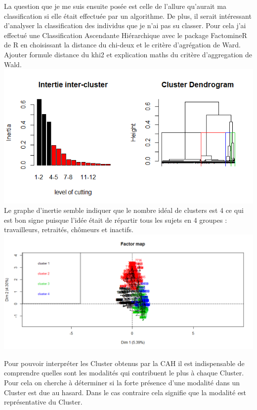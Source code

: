 \documentclass{book}
\begin{document}
\noindent
La question que je me suis ensuite posée est celle de l'allure qu'aurait ma classification si elle était effectuée par un algorithme. De plus, il serait intéressant d'analyser la classification des individus que je n'ai pas su classer.
Pour cela j'ai effectué une Classification Ascendante Hiérarchique avec le package FactomineR de R en choisissant la distance du chi-deux et le critère d'agrégation de Ward.\\

Ajouter formule distance du khi2 et explication maths du critère d'aggregation de Wald.\\

\includegraphics[scale = 1]{dendro_inertie_cah.png}
\noindent
Le graphe d'inertie semble indiquer que le nombre idéal de clusters est 4 ce qui est bon signe puisque l'idée était de répartir tous les sujets en 4 groupes : travailleurs, retraités, chômeurs et inactifs.\\

\includegraphics[scale = .5]{cah_ind_cluster.png}

\noindent
Pour pouvoir interpréter les Cluster obtenus par la CAH il est indispensable de comprendre quelles sont les modalités qui contribuent le plus à chaque Cluster.\\
Pour cela on cherche à déterminer si la forte présence d'une modalité dans un Cluster est due au hasard. Dans le cas contraire cela signifie que la modalité est représentative du Cluster.\\
\end{document}
